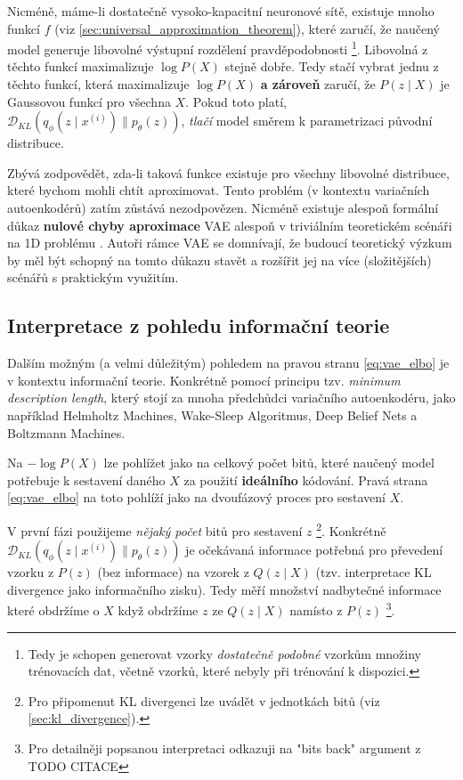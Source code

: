 Nicméně, máme-li dostatečně vysoko-kapacitní neuronové sítě, existuje mnoho funkcí $f$ (viz \autoref{sec:universal_approximation_theorem}), které zaručí, že naučený model generuje libovolné výstupní rozdělení pravděpodobnosti
\footnote{Tedy je schopen generovat vzorky \emph{dostatečně podobné} vzorkům množiny trénovacích dat, včetně vzorků, které nebyly při trénování k dispozici.}.
Libovolná z těchto funkcí maximalizuje $\log P(X)$ stejně dobře. Tedy stačí vybrat jednu z těchto funkcí, která maximalizuje $\log P(X)$ \textbf{a zároveň} zaručí, že $P (z\mid X)$ je Gaussovou funkcí pro všechna $X$.
Pokud toto platí, $\mathcal{D}_{KL}(q_\phi(z\mid x^{(i)})\parallel p_\theta(z))$, \emph{tlačí} model směrem k parametrizaci původní distribuce.

Zbývá zodpovědět, zda-li taková funkce existuje pro všechny libovolné distribuce, které bychom mohli chtít aproximovat.
Tento problém (v kontextu variačních autoenkodérů) zatím zůstává nezodpovězen. Nicméně existuje alespoň formální důkaz \textbf{nulové chyby aproximace} VAE alespoň v triviálním teoretickém scénáři na 1D problému \cite[Příloha A]{Doersch2021}.
Autoři rámce VAE se domnívají, že budoucí teoretický výzkum by měl být schopný na tomto důkazu stavět a rozšířit jej na více (složitějších) scénářů s praktickým využitím. 

\subsection{Interpretace z pohledu informační teorie}
\label{sec:vae_information_theory_interpretation}
Dalším možným (a velmi důležitým) pohledem na pravou stranu \autoref{eq:vae_elbo} je v kontextu informační teorie.
Konkrétně pomocí principu tzv. \emph{minimum description length}, který stojí za mnoha předchůdci variačního autoenkodéru, jako například Helmholtz Machines, Wake-Sleep Algoritmus, Deep Belief Nets a Boltzmann Machines.

Na $- \log P(X)$ lze pohlížet jako na celkový počet bitů, které naučený model potřebuje k sestavení daného $X$ za použití \textbf{ideálního} kódování.
Pravá strana \autoref{eq:vae_elbo} na toto pohlíží jako na dvoufázový proces pro sestavení $X$.

V první fázi použijeme \emph{nějaký počet} bitů pro sestavení $z$ \footnote{Pro připomenut KL divergenci lze uvádět v jednotkách bitů (viz \autoref{sec:kl_divergence}).}.
Konkrétně $\mathcal{D}_{KL}(q_\phi(z\mid x^{(i)})\parallel p_\theta(z))$ je očekávaná informace potřebná pro převedení vzorku z $P(z)$ (bez informace) na vzorek z $Q(z\mid X)$ (tzv. interpretace KL divergence jako informačního zisku).
Tedy měří množství nadbytečné informace které obdržíme o $X$ když obdržíme $z$ ze $Q(z\mid X)$ namísto z $P(z)$
\footnote{Pro detailněji popsanou interpretaci odkazuji na "bits back" argument z TODO CITACE }.

